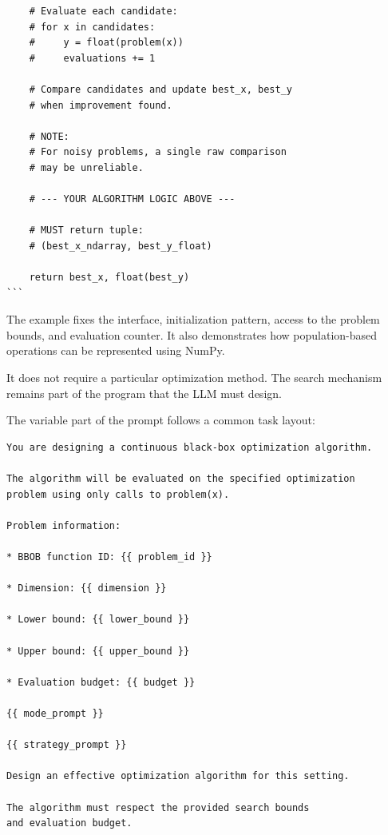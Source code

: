 \begin{verbatim}
    # Evaluate each candidate:
    # for x in candidates:
    #     y = float(problem(x))
    #     evaluations += 1

    # Compare candidates and update best_x, best_y
    # when improvement found.

    # NOTE:
    # For noisy problems, a single raw comparison
    # may be unreliable.

    # --- YOUR ALGORITHM LOGIC ABOVE ---

    # MUST return tuple:
    # (best_x_ndarray, best_y_float)

    return best_x, float(best_y)
```

\end{verbatim}

The example fixes the interface, initialization pattern, access to the problem
bounds, and evaluation counter. It also demonstrates how population-based
operations can be represented using NumPy.

It does not require a particular optimization method. The search mechanism
remains part of the program that the LLM must design.


The variable part of the prompt follows a common task layout:

\begin{verbatim}
You are designing a continuous black-box optimization algorithm.

The algorithm will be evaluated on the specified optimization
problem using only calls to problem(x).

Problem information:

* BBOB function ID: {{ problem_id }}

* Dimension: {{ dimension }}

* Lower bound: {{ lower_bound }}

* Upper bound: {{ upper_bound }}

* Evaluation budget: {{ budget }}

{{ mode_prompt }}

{{ strategy_prompt }}

Design an effective optimization algorithm for this setting.

The algorithm must respect the provided search bounds
and evaluation budget.
\end{verbatim}

